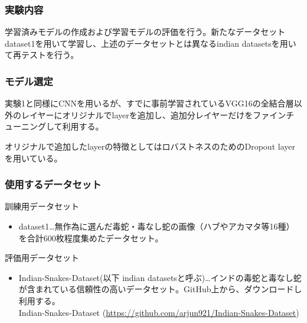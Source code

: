 \documentclass[a4paper, 11pt, titlepage]{jsarticle}
\begin{document}
\subsubsection{実験内容}
学習済みモデルの作成および学習モデルの評価を行う。新たなデータセットdataset1を用いて学習し、上述のデータセットとは異なるindian datasetsを用いて再テストを行う。

\subsubsection{モデル選定}
実験1と同様にCNNを用いるが、すでに事前学習されているVGG16の全結合層以外のレイヤーにオリジナルでlayerを追加し、追加分レイヤーだけをファインチューニングして利用する。\par
オリジナルで追加したlayerの特徴としてはロバストネスのためのDropout layerを用いている。

\subsubsection{使用するデータセット}
訓練用データセット
\begin{itemize}
\item dataset1…無作為に選んだ毒蛇・毒なし蛇の画像（ハブやアカマタ等16種）を合計600枚程度集めたデータセット。
\end{itemize}\par
評価用データセット
\begin{itemize}
\item Indian-Snakes-Dataset(以下 indian datasetsと呼ぶ)…インドの毒蛇と毒なし蛇が含まれている信頼性の高いデータセット。GitHub上から、ダウンロードし利用する。\\
Indian-Snakes-Dataset  (\url{https://github.com/arjun921/Indian-Snakes-Dataset})
\end{itemize}
\end{document}
